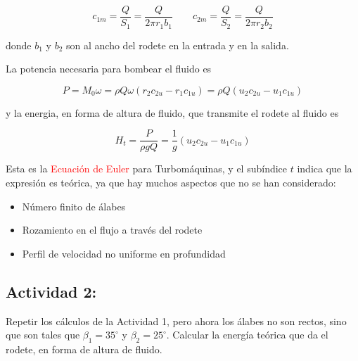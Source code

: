 \begin{equation}
	c_{1m}=\frac{Q}{S_{1}}=\frac{Q}{2\pi r_{1}b_{1}}\qquad c_{2m}=\frac{Q}{S_{2}}=\frac{Q}{2\pi r_{2}b_{2}}
\end{equation}

donde $b_{1}$ y $b_{2}$ son al ancho del rodete en la entrada y
en la salida.



La potencia necesaria para bombear el fluido es 

\begin{equation}
	P=M_{0}\omega=\rho Q\omega\left(r_{2}c_{2u}-r_{1}c_{1u}\right)=\rho Q\left(u_{2}c_{2u}-u_{1}c_{1u}\right)
\end{equation}

y la energia, en forma de altura de fluido, que transmite el rodete
al fluido es 

\begin{equation}
	\boxed{H_{t}=\frac{P}{\rho gQ}=\frac{1}{g}\left(u_{2}c_{2u}-u_{1}c_{1u}\right)}
\end{equation}


Esta es la \textcolor{red}{Ecuación de Euler} para Turbomáquinas,
y el subíndice $t$ indica que la expresión es teórica, ya que hay
muchos aspectos que no se han considerado: 
\begin{itemize}
	\item Número finito de álabes 
	\item Rozamiento en el flujo a través del rodete 
	\item Perfil de velocidad no uniforme en profundidad 
\end{itemize}


\subsection*{Actividad 2:}
	Repetir los cálculos de la Actividad 1, pero ahora los álabes no
	son rectos, sino que son tales que $\beta_{1}=35^{\circ}$ y $\beta_{2}=25^{\circ}$.
	Calcular la energía teórica que da el rodete, en forma de altura de
	fluido. 
